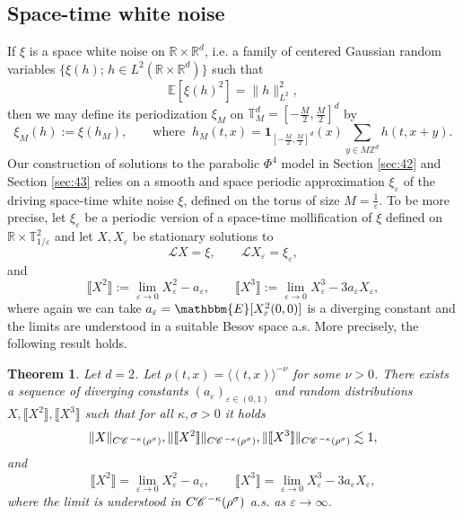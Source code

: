 \documentclass[a4paper,11pt]{article}
\newcommand{\assign}{:=}
\newtheorem{theorem}{Theorem}[section]
\numberwithin{equation}{section}
\newcommand{\CC}{\mathscr{C} \hspace{.1em}}
\newcommand{\LL}{\mathscr{L}}
\newcommand{\R}{\mathbb{R}}
\newcommand{\8}{\infty}
\begin{document}
\subsection{Space-time white noise}
\label{ssec:renorm-par}



If $\xi$ is a space white noise on $\R\times\R^{d}$, i.e. a family of centered Gaussian random variables $\{\xi(h);\,h\in L^{2}(\R\times\R^{d}) \}$ such that
$$
\mathbb{E}[\xi(h)^{2}]=\|h\|^{2}_{L^{2}},
$$
then we may define its periodization $\xi_{M}$ on $\mathbb{T}^{d}_{M}=\left[-\frac{M}{2},\frac{M}{2}\right]^{d}$  by
$$
\xi_{M}(h):=\xi(h_{M}),\qquad\text{where }\ h_{M}(t,x)=\mathbf{1}_{[-\frac{M}{2},\frac{M}{2}]^{d}}(x)\sum_{y\in M\mathbb{Z}^{d}}h(t,x+y).
$$
Our construction of solutions to the parabolic $\Phi^{4}$ model in Section \ref{sec:42} and Section \ref{sec:43} relies on  a smooth and space periodic approximation $\xi_{\varepsilon}$ of the driving space-time white noise $\xi$, defined on the torus of size $M=\frac 1\varepsilon$. To be more precise, let $\xi_{\varepsilon}$ be a periodic version of a space-time mollification of $\xi$ defined on $\R\times\mathbb{T}^{2}_{1/\varepsilon}$ and let $X,X_{\varepsilon}$ be stationary solutions to
\begin{equation*}
 \LL X = \xi, \qquad  \LL X_{\varepsilon} = \xi_{\varepsilon},
\end{equation*}
 and 
$$
 \llbracket X^2 \rrbracket  \assign \lim_{\varepsilon\to 0} X_{\varepsilon}^2 - a_{\varepsilon}, \qquad   \llbracket X^3 \rrbracket\assign\lim_{\varepsilon\to 0} X_{\varepsilon}^3 - 3 a_{\varepsilon} X_{\varepsilon},
 $$
 where again we can take $a_{\varepsilon}= \mathbbm{E}[X_{\varepsilon}^2(0,0)]$ is a diverging constant and the limits are understood in a suitable Besov space a.s. More precisely, the following result holds.
 
 
 \begin{theorem}\label{thm:renorm42}
Let $d=2$. Let $\rho(t,x)=\langle (t,x)\rangle^{-\nu}$ for some $\nu>0$. There exists a sequence of diverging constants $(a_{\varepsilon})_{\varepsilon\in (0,1)}$ and random distributions $X,\llbracket X^{2}\rrbracket,\llbracket X^{3}\rrbracket$  such that for all $\kappa,\sigma>0$  it holds
$$
\|X\|_{C\CC^{-\kappa}(\rho^{\sigma})},\|\llbracket X^{2}\rrbracket\|_{C\CC^{-\kappa}(\rho^{\sigma})}
,\|\llbracket X^{3}\rrbracket\|_{C\CC^{-\kappa}(\rho^{\sigma})}\lesssim 1,
$$
and
$$
 \llbracket X^2 \rrbracket  = \lim_{\varepsilon\to 0} X_{\varepsilon}^2 - a_{\varepsilon}, \qquad   \llbracket X^3 \rrbracket=\lim_{\varepsilon\to 0} X_{\varepsilon}^3 - 3 a_{\varepsilon} X_{\varepsilon},
 $$
where the limit is understood in $C\CC^{-\kappa}(\rho^{\sigma})$ a.s. as $\varepsilon\to\infty$.
\end{theorem}
\end{document}
